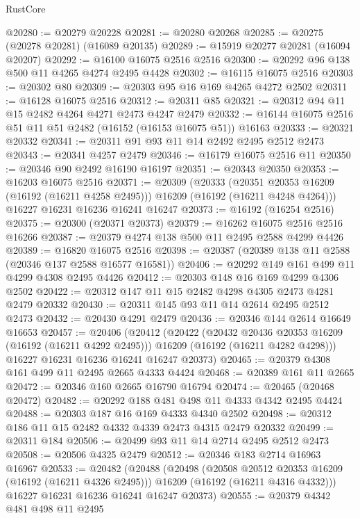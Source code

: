 \begin{lexlean}{RustCore}
\begin{coremodule}
@20280 := @20279 @20228
@20281 := @20280 @20268
@20285 := @20275 (@20278 @20281) (@16089 @20135)
@20289 := @15919 @20277 @20281 (@16094 @20207)
@20292 := @16100 @16075 @2516 @2516
@20300 := @20292 @96 @138 @500 @11 @4265 @4274 @2495 @4428
@20302 := @16115 @16075 @2516
@20303 := @20302 @80
@20309 := @20303 @95 @16 @169 @4265 @4272 @2502
@20311 := @16128 @16075 @2516
@20312 := @20311 @85
@20321 := @20312 @94 @11 @15 @2482 @4264 @4271 @2473 @4247 @2479
@20332 := @16144 @16075 @2516 @51 @11 @51 @2482 (@16152 (@16153 @16075 @51)) @16163
@20333 := @20321 @20332
@20341 := @20311 @91 @93 @11 @14 @2492 @2495 @2512 @2473
@20343 := @20341 @4257 @2479
@20346 := @16179 @16075 @2516 @11
@20350 := @20346 @90 @2492 @16190 @16197
@20351 := @20343 @20350
@20353 := @16203 @16075 @2516
@20371 := @20309
    (@20333
      (@20351 @20353 @16209 (@16192 (@16211 @4258 @2495)))
      @16209
      (@16192 (@16211 @4248 @4264)))
    @16227
    @16231
    @16236
    @16241
    @16247
@20373 := @16192 (@16254 @2516)
@20375 := @20300 (@20371 @20373)
@20379 := @16262 @16075 @2516 @2516 @16266
@20387 := @20379 @4274 @138 @500 @11 @2495 @2588 @4299 @4426
@20389 := @16820 @16075 @2516
@20398 := @20387 (@20389 @138 @11 @2588 (@20346 @137 @2588 @16577 @16581))
@20406 := @20292 @149 @161 @499 @11 @4299 @4308 @2495 @4426
@20412 := @20303 @148 @16 @169 @4299 @4306 @2502
@20422 := @20312 @147 @11 @15 @2482 @4298 @4305 @2473 @4281 @2479 @20332
@20430 := @20311 @145 @93 @11 @14 @2614 @2495 @2512 @2473
@20432 := @20430 @4291 @2479
@20436 := @20346 @144 @2614 @16649 @16653
@20457 := @20406
    (@20412
      (@20422
        (@20432 @20436 @20353 @16209 (@16192 (@16211 @4292 @2495)))
        @16209
        (@16192 (@16211 @4282 @4298)))
      @16227
      @16231
      @16236
      @16241
      @16247
      @20373)
@20465 := @20379 @4308 @161 @499 @11 @2495 @2665 @4333 @4424
@20468 := @20389 @161 @11 @2665
@20472 := @20346 @160 @2665 @16790 @16794
@20474 := @20465 (@20468 @20472)
@20482 := @20292 @188 @481 @498 @11 @4333 @4342 @2495 @4424
@20488 := @20303 @187 @16 @169 @4333 @4340 @2502
@20498 := @20312 @186 @11 @15 @2482 @4332 @4339 @2473 @4315 @2479 @20332
@20499 := @20311 @184
@20506 := @20499 @93 @11 @14 @2714 @2495 @2512 @2473
@20508 := @20506 @4325 @2479
@20512 := @20346 @183 @2714 @16963 @16967
@20533 := @20482
    (@20488
      (@20498
        (@20508 @20512 @20353 @16209 (@16192 (@16211 @4326 @2495)))
        @16209
        (@16192 (@16211 @4316 @4332)))
      @16227
      @16231
      @16236
      @16241
      @16247
      @20373)
@20555 := @20379
    @4342
    @481
    @498
    @11
    @2495

\end{coremodule}
\end{lexlean}
